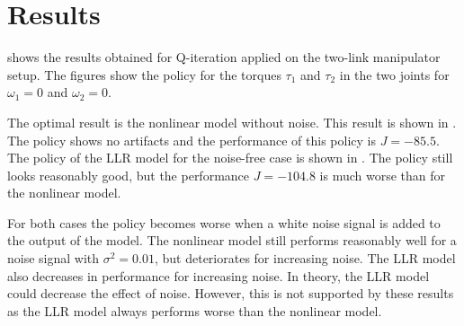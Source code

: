 \section{Results}
 shows the results obtained for Q-iteration applied on the two-link manipulator setup. The figures show the policy for the torques $\tau_1$ and $\tau_2$ in the two joints for $\omega_1=0$ and $\omega_2=0$.

The optimal result is the nonlinear model without noise. This result is shown in . The policy shows no artifacts and the performance of this policy is $J = -85.5$. The policy of the \ac{LLR} model for the noise-free case is shown in . The policy still looks reasonably good, but the performance $J=-104.8$ is much worse than for the nonlinear model.

For both cases the policy becomes worse when a white noise signal is added to the output of the model. The nonlinear model still performs reasonably well for a noise signal with $\sigma^2 = 0.01$, but deteriorates for increasing noise. The \ac{LLR} model also decreases in performance for increasing noise. In theory, the \ac{LLR} model could decrease the effect of noise. However, this is not supported by these results as the \ac{LLR} model always performs worse than the nonlinear model.


